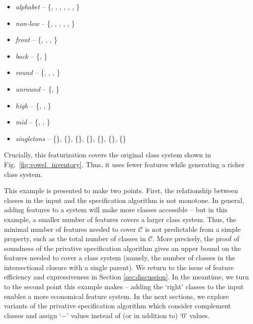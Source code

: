 \documentclass[11pt, oneside]{article}   	%
\begin{document}
 \begin{itemize}
	\item \textit{alphabet} -- \{, , , , \textipa{\oe}, , \} 
	\item \textit{non-low} -- \{, , , , \textipa{\oe}, \} 
    \item \textit{front} -- \{, , , \textipa{\oe}\}
    \item \textit{back} -- \{, \}
    \item \textit{round} -- \{, , \textipa{\oe}, \}
    \item \textit{unround} -- \{, \}
    \item \textit{high} --  \{, , \}
    \item \textit{mid} --  \{, \textipa{\oe}, \}
    \item \textit{singletons} -- \{\}, \{\}, \{\}, \{\}, \{\textipa{\oe}\}, \{\}, \{\}
    \end{itemize}
Crucially, this featurization covers the original class system shown in Fig.~\ref{fig:vowel_inventory}. Thus, it uses fewer features while generating a richer class system.

This example is presented to make two points. First, the relationship between classes in the input and the specification algorithm is not monotone. In general, adding features to a system will make more classes accessible -- but in this example, a smaller number of features covers a larger class system. Thus, the minimal number of features needed to cover $\mathcal C$ is not predictable from a simple property, such as the total number of classes in $\mathcal C$. More precisely, the proof of soundness of the privative specification algorithm gives an upper bound on the features needed to cover a class system (namely, the number of classes in the intersectional closure with a single parent). We return to the issue of feature efficiency and expressiveness in Section \ref{sec:discussion}. In the meantime, we turn to the second point this example makes -- adding the `right' classes to the input enables a more economical feature system. In the next sections, we explore variants of the privative specification algorithm which consider complement classes and assign `$-$' values instead of (or in addition to) `$0$' values. 
\end{document}
